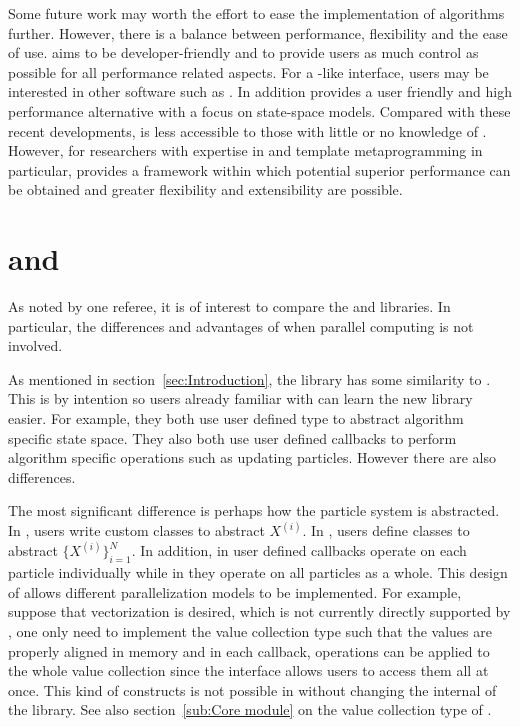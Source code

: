 \documentclass[11pt, fontset=Minion, showoverfull,
bib, mintcode, minted=cache]{marticle}
\begin{document}
Some future work may worth the effort to ease the implementation of \smc
algorithms further. However, there is a balance between performance,
flexibility and the ease of use. \vsmc aims to be developer-friendly and to
provide users as much control as possible for all performance related aspects.
For a \lbugs-like interface, users may be interested in other software such as
\fbiips \parencite{BiiPS}. In addition \flibbi \parencite{Murray2013bi}
provides a user friendly and high performance alternative with a focus on
state-space models. Compared with these recent developments, \vsmc is less
accessible to those with little or no knowledge of \cpp. However, for
researchers with expertise in \cpp and template metaprogramming in particular,
\vsmc provides a framework within which potential superior performance can be
obtained and greater flexibility and extensibility are possible.

\clearpage
\appendix

\section[vSMC and SMCTC]{\protect\vsmc and \protect\smctc}
\label{sec:vsmc and smctc}

As noted by one referee, it is of interest to compare the \vsmc and \lsmctc
libraries. In particular, the differences and advantages of \vsmc when
parallel computing is not involved.

As mentioned in section~\ref{sec:Introduction}, the \vsmc library has some
similarity to \lsmctc. This is by intention so users already familiar with
\lsmctc can learn the new library easier. For example, they both use user
defined type to abstract algorithm specific state space. They also both use
user defined callbacks to perform algorithm specific operations such as
updating particles. However there are also differences.

The most significant difference is perhaps how the particle system is
abstracted. In \lsmctc, users write custom classes to abstract $X^{(i)}$. In
\vsmc, users define classes to abstract $\{X^{(i)}\}_{i=1}^N$. In addition, in
\lsmctc user defined callbacks operate on each particle individually while in
\vsmc they operate on all particles as a whole. This design of \vsmc allows
different parallelization models to be implemented. For example, suppose that
\simd vectorization is desired, which is not currently directly supported by
\vsmc, one only need to implement the value collection type such that the
values are properly aligned in memory and in each callback, \simd operations
can be applied to the whole value collection since the \vsmc interface allows
users to access them all at once. This kind of constructs is not possible in
\lsmctc without changing the internal of the library. See also
section~\ref{sub:Core module} on the value collection type of \vsmc.
\end{document}
